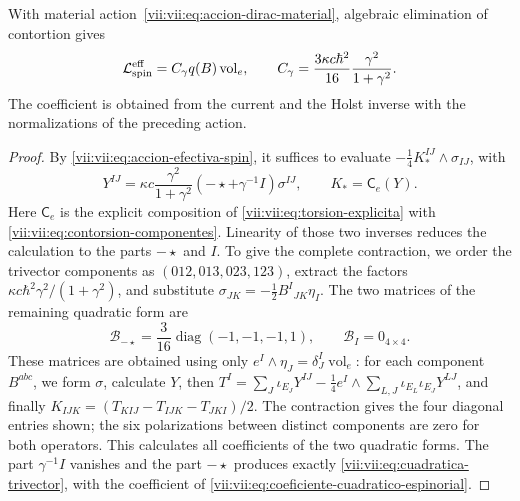 \begin{theorem}
\label{vii:vii:thm:coeficiente-torsional-espinorial}
With material action~\eqref{vii:vii:eq:accion-dirac-material}, algebraic
elimination of contortion gives
\begin{equation}
 \mathcal L_{\rm spin}^{\rm eff}
 =C_\gamma q(B)\operatorname{vol}_e,\qquad
 C_\gamma=\frac{3\kappa c\hbar^2}{16}
                      \frac{\gamma^2}{1+\gamma^2}.
 \label{vii:vii:eq:coeficiente-cuadratico-espinorial}
\end{equation}
The coefficient is obtained from the current and the Holst inverse
with the normalizations of the preceding action.
\end{theorem}
\begin{proof}
By \eqref{vii:vii:eq:accion-efectiva-spin}, it suffices to evaluate
\(-\frac14K_*^{IJ}\wedge\sigma_{IJ}\), with
\[
 Y^{IJ}=\kappa c\frac{\gamma^2}{1+\gamma^2}
           (-\star+\gamma^{-1}I)\sigma^{IJ},\qquad
 K_*=\mathsf C_e(Y).
\]
Here \(\mathsf C_e\) is the explicit composition of
\eqref{vii:vii:eq:torsion-explicita} with
\eqref{vii:vii:eq:contorsion-componentes}. Linearity of those two
inverses reduces the calculation to the parts \(-\star\) and \(I\).
To give the complete contraction, we order the trivector
components as \((012,013,023,123)\), extract the factors
\(\kappa c\hbar^2\gamma^2/(1+\gamma^2)\), and substitute
\(\sigma_{JK}=-\frac12B^I{}_{JK}\eta_I\). The two matrices
of the remaining quadratic form are
\begin{equation}
 \mathcal B_{-\star}
 =\frac3{16}\operatorname{diag}(-1,-1,-1,1),\qquad
 \mathcal B_I=0_{4\times4}.
 \label{vii:vii:eq:matrices-contraccion-espinorial}
\end{equation}
These matrices are obtained using only
\(e^I\wedge\eta_J=\delta_J^I\operatorname{vol}_e\): for
each component \(B^{abc}\), we form \(\sigma\), calculate
\(Y\), then
\(T^I=\sum_J\iota_{E_J}Y^{IJ}
 -\frac14e^I\wedge\sum_{L,J}\iota_{E_L}\iota_{E_J}Y^{LJ}\),
and finally
\(K_{IJK}=(T_{KIJ}-T_{IJK}-T_{JKI})/2\).
The contraction gives the four diagonal entries shown; the
six polarizations between distinct components are zero for both
operators. This calculates all coefficients of the two
quadratic forms. The part \(\gamma^{-1}I\) vanishes and the part
\(-\star\) produces exactly \eqref{vii:vii:eq:cuadratica-trivector},
with the coefficient of \eqref{vii:vii:eq:coeficiente-cuadratico-espinorial}.
\end{proof}

